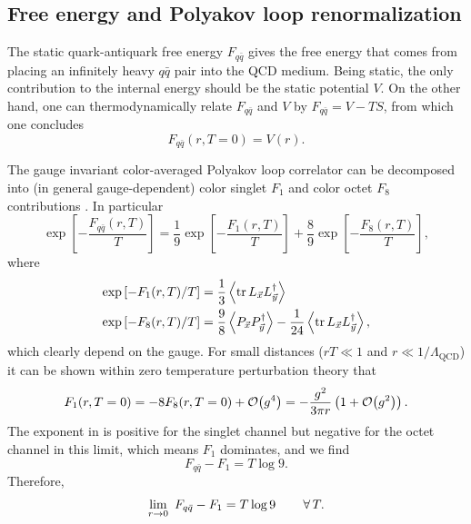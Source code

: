 \subsection{Free energy and Polyakov loop renormalization}

The static quark-antiquark free energy $F_{q\bar{q}}$ gives the free
energy that comes from placing an infinitely heavy $q\bar{q}$ pair into the QCD
medium. Being static, the only contribution to the internal energy should be the
static potential $V$. On the other hand, one can thermodynamically relate
$F_{q\bar{q}}$ and $V$ by $F_{q\bar{q}}=V-TS$, from which one concludes
\begin{equation}
  F_{q\bar{q}}(r,T=0)=V(r).
\end{equation}

The gauge invariant color-averaged Polyakov loop correlator can be decomposed
into (in general gauge-dependent) color singlet $F_1$ and color octet $F_8$
contributions
\cite{mclerran_monte_1981,mclerran_quark_1981,nadkarni_non-abelian_1986}.
In particular
\begin{equation}\label{eq:channels}
  \exp\left[-\frac{F_{q\bar{q}}(r,T)}{T}\right]
  =\frac{1}{9}\exp\left[-\frac{F_1(r,T)}{T}\right]
   +\frac{8}{9}\exp\left[-\frac{F_8(r,T)}{T}\right],
\end{equation}
where
\begin{equation}\begin{aligned}
 \exp\left[-F_1(r,T)/T\right]
   &=\frac{1}{3}\ev{\tr L_{\vec{x}}L^\dagger_{\vec{y}}}\\
  \exp\left[-F_8(r,T)/T\right]
    &=\frac{9}{8}\ev{P_{\vec{x}}P^\dagger_{\vec{y}}}
     -\frac{1}{24}\ev{\tr L_{\vec{x}}L^\dagger_{\vec{y}}},
\end{aligned}\end{equation}
which clearly depend on the gauge.
For small distances ($rT\ll1$ and $r\ll1/\Lambda_{\text{QCD}}$) it can
be shown within zero temperature perturbation theory
\cite{kaczmarek_heavy_2002} that
\begin{equation}\label{eq:Fperturb}
  F_1(r,T=0)
            =-8F_8(r,T=0)+\order{g^4}
            =-\frac{g^2}{3\pi r}\left(1+\order{g^2}\right).
\end{equation}
The exponent in  is positive for the singlet channel
but negative for the octet channel in this limit, which means $F_1$ dominates,
and we find
\begin{equation}
  F_{q\bar{q}}-F_1=T\log 9.
\end{equation}
Therefore,
\begin{equation}\label{eq:Tlog9}
  \lim_{r\to0}~F_{q\bar{q}}-F_1=T\log 9\qquad\operatorname{\forall} T.
\end{equation}

